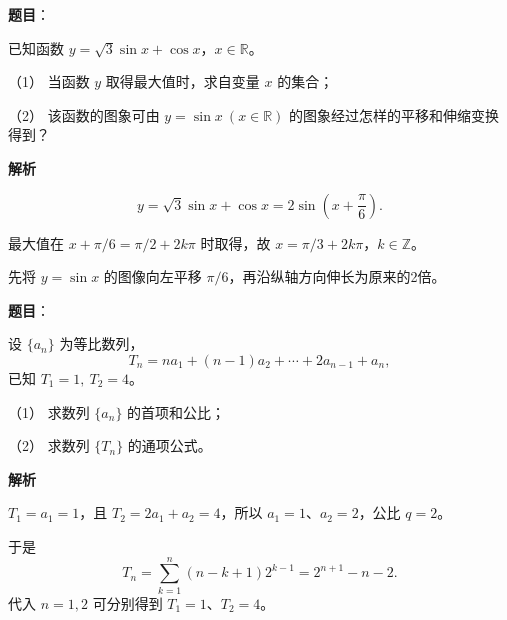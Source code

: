 \begin{answer}

\textbf{题目}：

已知函数 $y=\sqrt{3}\sin x+\cos x$，$x\in\mathbb{R}$。

（1） 当函数 $y$ 取得最大值时，求自变量 $x$ 的集合；

（2） 该函数的图象可由 $y=\sin x\ (x\in\mathbb{R})$ 的图象经过怎样的平移和伸缩变换得到？

\textbf{解析}

\nopagebreak[4]
\[
y=\sqrt3\sin x+\cos x=2\sin\left(x+\frac\pi6\right).
\]

最大值在 $x+\pi/6=\pi/2+2k\pi$ 时取得，故 $x=\pi/3+2k\pi$，$k\in\mathbb Z$。


先将 $y=\sin x$ 的图像向左平移 $\pi/6$，再沿纵轴方向伸长为原来的2倍。



\end{answer}
\begin{answer}

\textbf{题目}：

设 $\{a_n\}$ 为等比数列，
\nopagebreak[4]
\[
T_n=na_1+(n-1)a_2+\cdots+2a_{n-1}+a_n,
\]
已知 $T_1=1,\ T_2=4$。

（1） 求数列 $\{a_n\}$ 的首项和公比；

（2） 求数列 $\{T_n\}$ 的通项公式。

\textbf{解析}


$T_1=a_1=1$，且 $T_2=2a_1+a_2=4$，所以 $a_1=1$、$a_2=2$，公比 $q=2$。


于是
\nopagebreak[4]
\[
T_n=\sum_{k=1}^n(n-k+1)2^{k-1}=2^{n+1}-n-2.
\]
代入 $n=1,2$ 可分别得到 $T_1=1$、$T_2=4$。



\end{answer}
